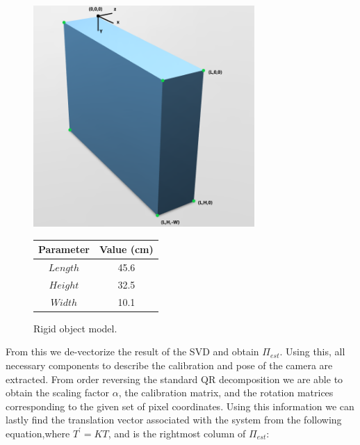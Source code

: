 \documentclass[12pt]{article}
\begin{document}
\begin{figure}[h]
	\centering %
	\captionsetup{justification=centering}
	\begin{minipage}{0.5\textwidth}
		\centering %
		\includegraphics[width=0.75\textwidth]{BoxModel.png}
		\caption{Rigid object model.} \label{box}
	\end{minipage}\hfill
	\begin{minipage}{0.5\textwidth}
		\begin{center}
			\begin{tabular}[5pt]{| c| c|}
				\hline
				Parameter	& Value (cm) \\[0.5ex] 
				\hline 	
				$Length$& 45.6  \\ \hline 
				$Height$& 32.5  \\ \hline 
				$Width$& 10.1  \\ \hline 
			\end{tabular}
			\label{boxdim}
		\end{center}	
	\end{minipage}
\end{figure}

\noindent From this we de-vectorize the result of the SVD and obtain $\Pi_{est}$. Using this, all necessary components to describe the calibration and pose of the camera are extracted. From order reversing the standard QR decomposition we are able to obtain the scaling factor $\alpha$, the calibration matrix, and the rotation matrices corresponding to the given set of pixel coordinates. Using this information we can lastly find the translation vector associated with the system from the following equation,where $T^{'} = KT$, and is the rightmost column of $\Pi_{est}$: 
\end{document}
